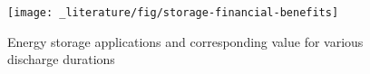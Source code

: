 \begin{figure}\centering
	\texttt{[image: \_literature/fig/storage-financial-benefits]}
	\caption{Energy storage applications and corresponding value for various discharge durations \cite{Deloitte2016}}
	\label{ch-literature:fig:storage-financial-benefits}
\end{figure}